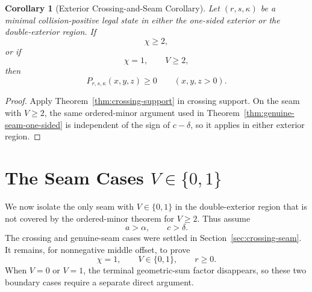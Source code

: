 \documentclass[11pt]{article}
\newtheorem{corollary}[theorem]{Corollary}
\theoremstyle{definition}
\begin{document}
\begin{corollary}[Exterior Crossing-and-Seam Corollary]
\label{thm:double-cross-seam}
Let \((r,s,\kappa)\) be a minimal collision-positive legal state in either the one-sided exterior or the double-exterior region.  If
\begin{equation*}
\chi\ge2,
\end{equation*}
or if
\begin{equation*}
\chi=1,\qquad V\ge2,
\end{equation*}
then
\begin{equation*}
P_{r,s,\kappa}(x,y,z)\ge0
\qquad(x,y,z>0).
\end{equation*}
\end{corollary}

\begin{proof}
Apply Theorem~\ref{thm:crossing-support} in crossing support.  On the seam with \(V\ge2\), the same ordered-minor argument used in Theorem~\ref{thm:genuine-seam-one-sided} is independent of the sign of \(c-\delta\), so it applies in either exterior region.
\end{proof}
\section{The Seam Cases \(V\in\{0,1\}\)}
\label{sec:seam-v01}

We now isolate the only seam with \(V\in\{0,1\}\) in the double-exterior region that is not covered by the ordered-minor theorem for \(V\ge2\).  Thus assume
\begin{equation*}
a>\alpha,\qquad c>\delta.
\end{equation*}
The crossing and genuine-seam cases were settled in Section~\ref{sec:crossing-seam}.  It remains, for nonnegative middle offset, to prove
\begin{equation*}
\chi=1,\qquad V\in\{0,1\},\qquad r\ge0.
\end{equation*}
When \(V=0\) or \(V=1\), the terminal geometric-sum factor disappears, so these two boundary cases require a separate direct argument.
\end{document}
